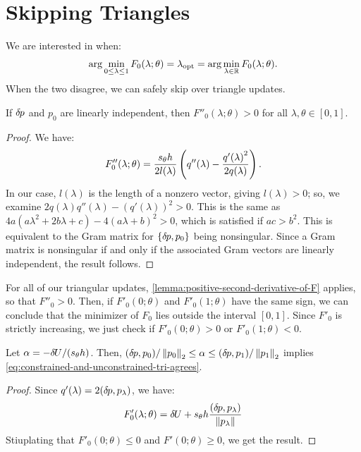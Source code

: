 \documentclass[eikonal.tex]{subfiles}
\begin{document}
\section{Skipping Triangles}

We are interested in when:
\begin{align}\label{eq:constrained-and-unconstrained-tri-agrees}
  \arg\min_{0 \leq \lambda \leq 1} F_0(\lambda; \theta) = \lambda_{\operatorname{opt}} = \arg\min_{\lambda \in \mathbb{R}} F_0(\lambda; \theta).
\end{align}
When the two disagree, we can safely skip over triangle updates.

\begin{lemma}\label{lemma:positive-second-derivative-of-F}
  If ${\delta \hspace{-0.08em} p}$ and $p_0$ are linearly independent, then
  $F''_0(\lambda; \theta) > 0$ for all $\lambda, \theta \in [0, 1]$.
\end{lemma}

\begin{proof}
  We have:
  \begin{align*}
    F_0''(\lambda; \theta) = \frac{s_{\theta}h}{2 l(\lambda)} \left(q''(\lambda) - \frac{{q'(\lambda)}^2}{2q(\lambda)}\right).
  \end{align*}
  In our case, $l(\lambda)$ is the length of a nonzero vector, giving
  $l(\lambda) > 0$; so, we examine
  $2q(\lambda)q''(\lambda) - {(q'(\lambda))}^2 > 0$. This is the same
  as $4a(a\lambda^2 + 2b\lambda + c) - 4(a\lambda + b)^2 > 0$, which
  is satisfied if $ac > b^2$. This is equivalent to the Gram matrix
  for $\left\{{\delta \hspace{-0.08em} p}, p_0\right\}$ being nonsingular. Since a Gram matrix is
  nonsingular if and only if the associated Gram vectors are linearly
  independent, the result follows.
\end{proof}

For all of our triangular updates,
\cref{lemma:positive-second-derivative-of-F} applies, so that
$F''_0 > 0$. Then, if $F'_0(0; \theta)$ and $F'_0(1; \theta)$ have the
same sign, we can conclude that the minimizer of $F_0$ lies outside
the interval $[0, 1]$. Since $F'_0$ is strictly increasing, we just
check if $F'_0(0; \theta) > 0$ or $F'_0(1; \theta) < 0$.

\begin{lemma}
  Let $\alpha = -{\delta \hspace{-0.09em} U}/(s_\theta h)$. Then,
  $({\delta \hspace{-0.08em} p}, p_0)/\left\|p_0\right\|_2 \leq \alpha \leq ({\delta \hspace{-0.08em} p},
  p_1)/\left\|p_1\right\|_2$ implies
  \cref{eq:constrained-and-unconstrained-tri-agrees}.
\end{lemma}

\begin{proof}
  Since $q'(\lambda) = 2({\delta \hspace{-0.08em} p}, p_\lambda)$, we have:
  \begin{align*}
    F_0'(\lambda; \theta) = {\delta \hspace{-0.09em} U} + s_\theta h \frac{({\delta \hspace{-0.08em} p}, p_\lambda)}{\left\|p_\lambda\right\|}
  \end{align*}
  Stiuplating that $F'_0(0; \theta) \leq 0$ and
  $F'(0; \theta) \geq 0$, we get the result.
\end{proof}
\end{document}
